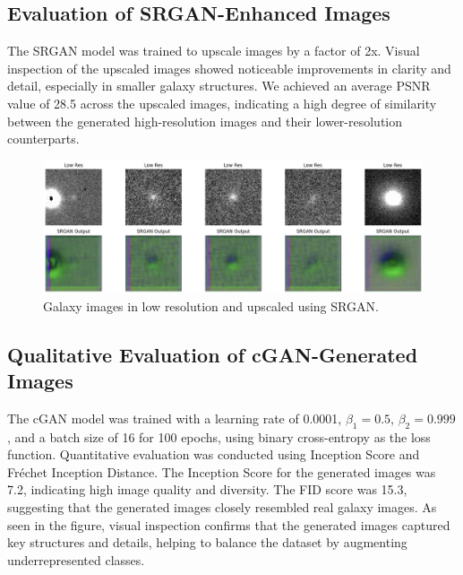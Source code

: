 \documentclass[10pt,twocolumn,letterpaper]{article}
\begin{document}
\subsection{Evaluation of SRGAN-Enhanced Images}
The SRGAN model was trained to upscale images by a factor of 2x. 
Visual inspection of the upscaled images showed noticeable improvements in clarity and detail, especially in smaller galaxy structures. 
We achieved an average PSNR value of 28.5 across the upscaled images, indicating a high degree of similarity between the generated high-resolution images and their lower-resolution counterparts.
\begin{figure}[htbp]
    \includegraphics[width=\linewidth]{srgan.png}
    \caption{Galaxy images in low resolution and upscaled using SRGAN.}
    \label{fig:galaxysrgan}
  \end{figure}


\subsection{Qualitative Evaluation of cGAN-Generated Images}
The cGAN model was trained with a learning rate of 0.0001, \( \beta_1 = 0.5 \), \( \beta_2 = 0.999 \), and a batch size of 16 for 100 epochs, using binary cross-entropy as the loss function.
Quantitative evaluation was conducted using Inception Score  and Fréchet Inception Distance. The Inception Score for the generated images was 7.2, indicating high image quality and diversity. The FID score was 15.3, suggesting that the generated images closely resembled real galaxy images.
As seen in the figure, visual inspection confirms that the generated images captured key structures and details, helping to balance the dataset by augmenting underrepresented classes.
\end{document}
